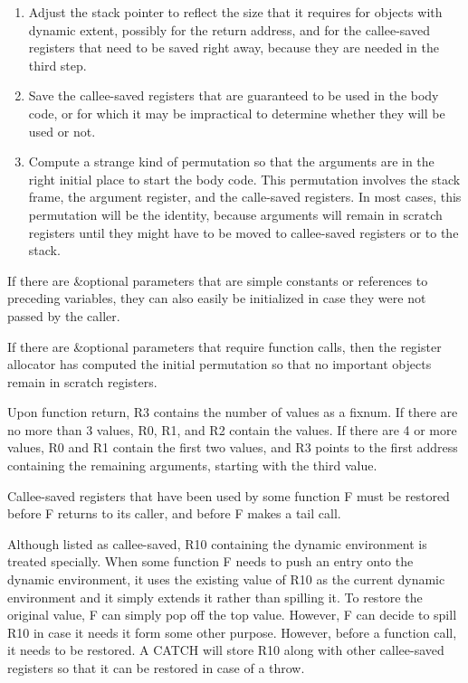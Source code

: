 \begin{enumerate}
\item Adjust the stack pointer to reflect the size that it requires
  for objects with dynamic extent, possibly for the return address,
  and for the callee-saved registers that need to be saved right
  away, because they are needed in the third step. 
\item Save the callee-saved registers that are guaranteed to be used
  in the body code, or for which it may be impractical to determine
  whether they will be used or not.  
\item Compute a strange kind of permutation so that the arguments are
  in the right initial place to start the body code.  This permutation
  involves the stack frame, the argument register, and the calle-saved
  registers.  In most cases, this permutation will be the identity,
  because arguments will remain in scratch registers until they might
  have to be moved to callee-saved registers or to the stack. 
\end{enumerate}

If there are \&optional parameters that are simple constants or
references to preceding variables, they can also easily be
initialized in case they were not passed by the caller. 

If there are \&optional parameters that require function calls, then
the register allocator has computed the initial permutation so that no
important objects remain in scratch registers.  

Upon function return, R3 contains the number of values as a fixnum.
If there are no more than 3 values, R0, R1, and R2 contain the
values. If there are 4 or more values, R0 and R1 contain the first two
values, and R3 points to the first address containing the remaining
arguments, starting with the third value.

Callee-saved registers that have been used by some function F must be
restored before F returns to its caller, and before F makes a tail
call.

Although listed as callee-saved, R10 containing the dynamic
environment is treated specially.  When some function F needs to push
an entry onto the dynamic environment, it uses the existing value of
R10 as the current dynamic environment and it simply extends it rather
than spilling it.  To restore the original value, F can simply pop off
the top value.  However, F can decide to spill R10 in case it needs it
form some other purpose.  However, before a function call, it needs to
be restored.  A CATCH will store R10 along with other callee-saved
registers so that it can be restored in case of a throw.

